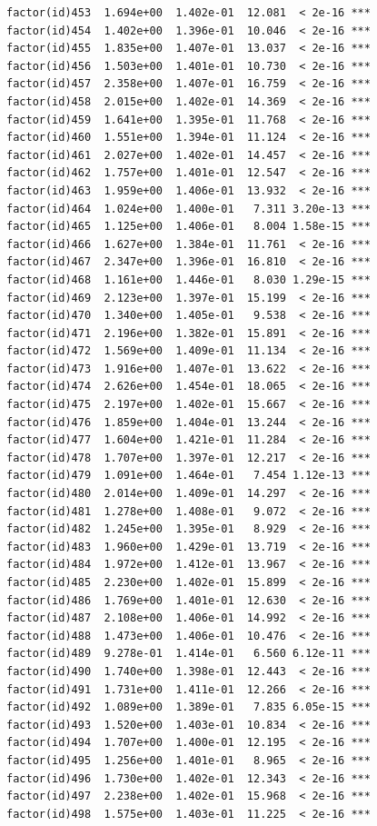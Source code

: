 \documentclass[]{book}
\begin{document}
\begin{verbatim}
factor(id)453  1.694e+00  1.402e-01  12.081  < 2e-16 ***
factor(id)454  1.402e+00  1.396e-01  10.046  < 2e-16 ***
factor(id)455  1.835e+00  1.407e-01  13.037  < 2e-16 ***
factor(id)456  1.503e+00  1.401e-01  10.730  < 2e-16 ***
factor(id)457  2.358e+00  1.407e-01  16.759  < 2e-16 ***
factor(id)458  2.015e+00  1.402e-01  14.369  < 2e-16 ***
factor(id)459  1.641e+00  1.395e-01  11.768  < 2e-16 ***
factor(id)460  1.551e+00  1.394e-01  11.124  < 2e-16 ***
factor(id)461  2.027e+00  1.402e-01  14.457  < 2e-16 ***
factor(id)462  1.757e+00  1.401e-01  12.547  < 2e-16 ***
factor(id)463  1.959e+00  1.406e-01  13.932  < 2e-16 ***
factor(id)464  1.024e+00  1.400e-01   7.311 3.20e-13 ***
factor(id)465  1.125e+00  1.406e-01   8.004 1.58e-15 ***
factor(id)466  1.627e+00  1.384e-01  11.761  < 2e-16 ***
factor(id)467  2.347e+00  1.396e-01  16.810  < 2e-16 ***
factor(id)468  1.161e+00  1.446e-01   8.030 1.29e-15 ***
factor(id)469  2.123e+00  1.397e-01  15.199  < 2e-16 ***
factor(id)470  1.340e+00  1.405e-01   9.538  < 2e-16 ***
factor(id)471  2.196e+00  1.382e-01  15.891  < 2e-16 ***
factor(id)472  1.569e+00  1.409e-01  11.134  < 2e-16 ***
factor(id)473  1.916e+00  1.407e-01  13.622  < 2e-16 ***
factor(id)474  2.626e+00  1.454e-01  18.065  < 2e-16 ***
factor(id)475  2.197e+00  1.402e-01  15.667  < 2e-16 ***
factor(id)476  1.859e+00  1.404e-01  13.244  < 2e-16 ***
factor(id)477  1.604e+00  1.421e-01  11.284  < 2e-16 ***
factor(id)478  1.707e+00  1.397e-01  12.217  < 2e-16 ***
factor(id)479  1.091e+00  1.464e-01   7.454 1.12e-13 ***
factor(id)480  2.014e+00  1.409e-01  14.297  < 2e-16 ***
factor(id)481  1.278e+00  1.408e-01   9.072  < 2e-16 ***
factor(id)482  1.245e+00  1.395e-01   8.929  < 2e-16 ***
factor(id)483  1.960e+00  1.429e-01  13.719  < 2e-16 ***
factor(id)484  1.972e+00  1.412e-01  13.967  < 2e-16 ***
factor(id)485  2.230e+00  1.402e-01  15.899  < 2e-16 ***
factor(id)486  1.769e+00  1.401e-01  12.630  < 2e-16 ***
factor(id)487  2.108e+00  1.406e-01  14.992  < 2e-16 ***
factor(id)488  1.473e+00  1.406e-01  10.476  < 2e-16 ***
factor(id)489  9.278e-01  1.414e-01   6.560 6.12e-11 ***
factor(id)490  1.740e+00  1.398e-01  12.443  < 2e-16 ***
factor(id)491  1.731e+00  1.411e-01  12.266  < 2e-16 ***
factor(id)492  1.089e+00  1.389e-01   7.835 6.05e-15 ***
factor(id)493  1.520e+00  1.403e-01  10.834  < 2e-16 ***
factor(id)494  1.707e+00  1.400e-01  12.195  < 2e-16 ***
factor(id)495  1.256e+00  1.401e-01   8.965  < 2e-16 ***
factor(id)496  1.730e+00  1.402e-01  12.343  < 2e-16 ***
factor(id)497  2.238e+00  1.402e-01  15.968  < 2e-16 ***
factor(id)498  1.575e+00  1.403e-01  11.225  < 2e-16 ***

\end{verbatim}
\end{document}
